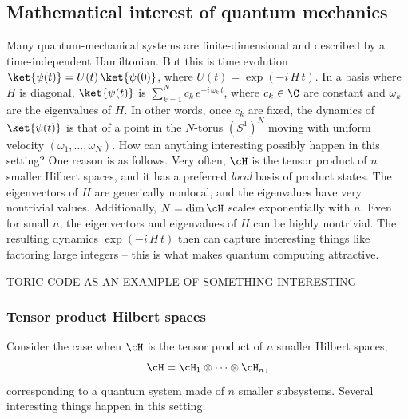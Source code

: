 \subsection{Mathematical interest of quantum mechanics}
Many quantum-mechanical systems are finite-dimensional and described by a time-independent Hamiltonian. But this is  time evolution $\ket{\psi(t)} = U(t) \, \ket{\psi(0)}$, where $U(t) = \exp(-i \, H \, t)$. In a basis where $H$ is diagonal, $\ket{\psi(t)}$ is $\sum_{k=1}^{N}{c_k \, e^{-i \, \omega_k \, t}}$, where $c_k \in \C$ are constant and $\omega_k$ are the eigenvalues of $H$. In other words, once $c_k$ are fixed, the dynamics of $\ket{\psi(t)}$ is that of a point in the $N$-torus $(S^1)^N$ moving with uniform velocity $(\omega_1, \dots, \omega_N)$. How can anything interesting possibly happen in this  setting? One reason is as follows. Very often, $\cH$ is the tensor product of $n$ smaller Hilbert spaces, and it has a preferred \emph{local} basis of product states. The eigenvectors of $H$ are generically nonlocal, and the eigenvalues have very nontrivial values. Additionally, $N = \dim \cH$ scales exponentially with $n$. Even for small $n$, the eigenvectors and eigenvalues of $H$ can be highly nontrivial. The resulting dynamics $\exp(-i \, H \, t)$ then can capture interesting things like factoring large integers -- this is what makes quantum computing attractive.

TORIC CODE AS AN EXAMPLE OF SOMETHING INTERESTING

\subsubsection{Tensor product Hilbert spaces}
Consider the case when $\cH$ is the tensor product of $n$ smaller Hilbert spaces,
\begin{equation}
    \cH = \cH_1 \otimes \dots \otimes \cH_n,
\end{equation}
corresponding to a quantum system made of $n$ smaller subsystems. Several interesting things happen in this setting.


